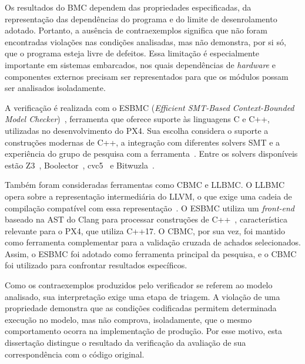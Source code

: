 Os resultados do BMC dependem das propriedades especificadas, da representação das dependências do programa e do limite de desenrolamento adotado. Portanto, a ausência de contraexemplos significa que não foram encontradas violações nas condições analisadas, mas não demonstra, por si só, que o programa esteja livre de defeitos. Essa limitação é especialmente importante em sistemas embarcados, nos quais dependências de \textit{hardware} e componentes externos precisam ser representados para que os módulos possam ser analisados isoladamente.

A verificação é realizada com o ESBMC (\textit{Efficient SMT-Based Context-Bounded Model Checker})~\cite{Cordeiro2012}, ferramenta que oferece suporte às linguagens C e C++, utilizadas no desenvolvimento do PX4. Sua escolha considera o suporte a construções modernas de C++, a integração com diferentes solvers SMT e a experiência do grupo de pesquisa com a ferramenta~\cite{Song2024}. Entre os solvers disponíveis estão Z3~\cite{deMoura2008}, Boolector~\cite{Brummayer2009}, cvc5~\cite{Barbosa2022} e Bitwuzla~\cite{Niemetz2023}.

Também foram consideradas ferramentas como CBMC e LLBMC. O LLBMC opera sobre a representação intermediária do LLVM, o que exige uma cadeia de compilação compatível com essa representação~\cite{Merz2012}. O ESBMC utiliza um \textit{front-end} baseado na AST do Clang para processar construções de C++~\cite{Song2024}, característica relevante para o PX4, que utiliza C++17. O CBMC, por sua vez, foi mantido como ferramenta complementar para a validação cruzada de achados selecionados. Assim, o ESBMC foi adotado como ferramenta principal da pesquisa, e o CBMC foi utilizado para confrontar resultados específicos.

Como os contraexemplos produzidos pelo verificador se referem ao modelo analisado, sua interpretação exige uma etapa de triagem. A violação de uma propriedade demonstra que as condições codificadas permitem determinada execução no modelo, mas não comprova, isoladamente, que o mesmo comportamento ocorra na implementação de produção. Por esse motivo, esta dissertação distingue o resultado da verificação da avaliação de sua correspondência com o código original.

